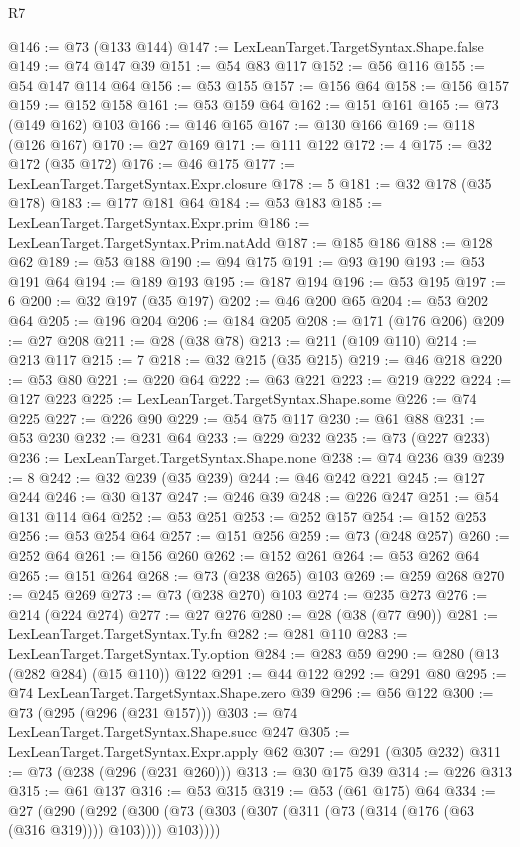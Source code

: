 \begin{lexlean}{R7}
\begin{coremodule}
@146 := @73 (@133 @144)
@147 := LexLeanTarget.TargetSyntax.Shape.false
@149 := @74 @147 @39
@151 := @54 @83 @117
@152 := @56 @116
@155 := @54 @147 @114 @64
@156 := @53 @155
@157 := @156 @64
@158 := @156 @157
@159 := @152 @158
@161 := @53 @159 @64
@162 := @151 @161
@165 := @73 (@149 @162) @103
@166 := @146 @165
@167 := @130 @166
@169 := @118 (@126 @167)
@170 := @27 @169
@171 := @111 @122
@172 := 4
@175 := @32 @172 (@35 @172)
@176 := @46 @175
@177 := LexLeanTarget.TargetSyntax.Expr.closure
@178 := 5
@181 := @32 @178 (@35 @178)
@183 := @177 @181 @64
@184 := @53 @183
@185 := LexLeanTarget.TargetSyntax.Expr.prim
@186 := LexLeanTarget.TargetSyntax.Prim.natAdd
@187 := @185 @186
@188 := @128 @62
@189 := @53 @188
@190 := @94 @175
@191 := @93 @190
@193 := @53 @191 @64
@194 := @189 @193
@195 := @187 @194
@196 := @53 @195
@197 := 6
@200 := @32 @197 (@35 @197)
@202 := @46 @200 @65
@204 := @53 @202 @64
@205 := @196 @204
@206 := @184 @205
@208 := @171 (@176 @206)
@209 := @27 @208
@211 := @28 (@38 @78)
@213 := @211 (@109 @110)
@214 := @213 @117
@215 := 7
@218 := @32 @215 (@35 @215)
@219 := @46 @218
@220 := @53 @80
@221 := @220 @64
@222 := @63 @221
@223 := @219 @222
@224 := @127 @223
@225 := LexLeanTarget.TargetSyntax.Shape.some
@226 := @74 @225
@227 := @226 @90
@229 := @54 @75 @117
@230 := @61 @88
@231 := @53 @230
@232 := @231 @64
@233 := @229 @232
@235 := @73 (@227 @233)
@236 := LexLeanTarget.TargetSyntax.Shape.none
@238 := @74 @236 @39
@239 := 8
@242 := @32 @239 (@35 @239)
@244 := @46 @242 @221
@245 := @127 @244
@246 := @30 @137
@247 := @246 @39
@248 := @226 @247
@251 := @54 @131 @114 @64
@252 := @53 @251
@253 := @252 @157
@254 := @152 @253
@256 := @53 @254 @64
@257 := @151 @256
@259 := @73 (@248 @257)
@260 := @252 @64
@261 := @156 @260
@262 := @152 @261
@264 := @53 @262 @64
@265 := @151 @264
@268 := @73 (@238 @265) @103
@269 := @259 @268
@270 := @245 @269
@273 := @73 (@238 @270) @103
@274 := @235 @273
@276 := @214 (@224 @274)
@277 := @27 @276
@280 := @28 (@38 (@77 @90))
@281 := LexLeanTarget.TargetSyntax.Ty.fn
@282 := @281 @110
@283 := LexLeanTarget.TargetSyntax.Ty.option
@284 := @283 @59
@290 := @280 (@13 (@282 @284) (@15 @110)) @122
@291 := @44 @122
@292 := @291 @80
@295 := @74 LexLeanTarget.TargetSyntax.Shape.zero @39
@296 := @56 @122
@300 := @73 (@295 (@296 (@231 @157)))
@303 := @74 LexLeanTarget.TargetSyntax.Shape.succ @247
@305 := LexLeanTarget.TargetSyntax.Expr.apply @62
@307 := @291 (@305 @232)
@311 := @73 (@238 (@296 (@231 @260)))
@313 := @30 @175 @39
@314 := @226 @313
@315 := @61 @137
@316 := @53 @315
@319 := @53 (@61 @175) @64
@334 := @27
    (@290 (@292 (@300 (@73 (@303 (@307 (@311 (@73 (@314 (@176 (@63 (@316 @319)))) @103)))) @103))))

\end{coremodule}
\end{lexlean}
